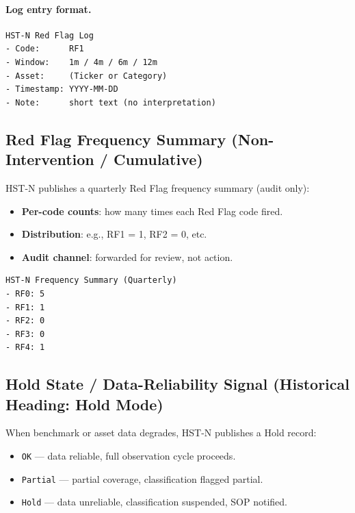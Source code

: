 \paragraph{Log entry format.}

\begin{lstlisting}[basicstyle=\ttfamily\small,frame=single]
HST-N Red Flag Log
- Code:      RF1
- Window:    1m / 4m / 6m / 12m
- Asset:     (Ticker or Category)
- Timestamp: YYYY-MM-DD
- Note:      short text (no interpretation)
\end{lstlisting}

\subsection{Red Flag Frequency Summary
(Non-Intervention / Cumulative)}
\label{sec:hstn-v11-frequency-summary}

HST-N publishes a quarterly Red Flag frequency summary (audit only):

\begin{itemize}
\item \textbf{Per-code counts}: how many times each Red Flag code
fired.
\item \textbf{Distribution}: e.g., RF1 = 1, RF2 = 0, etc.
\item \textbf{Audit channel}: forwarded for review, not action.
\end{itemize}

\begin{lstlisting}[basicstyle=\ttfamily\small,frame=single]
HST-N Frequency Summary (Quarterly)
- RF0: 5
- RF1: 1
- RF2: 0
- RF3: 0
- RF4: 1
\end{lstlisting}

\subsection{Hold State / Data-Reliability Signal
(Historical Heading: Hold Mode)}
\label{sec:hstn-v11-hold-mode}


When benchmark or asset data degrades, HST-N publishes a Hold
record:

\begin{itemize}
\item \texttt{OK} --- data reliable, full observation cycle proceeds.
\item \texttt{Partial} --- partial coverage, classification flagged
partial.
\item \texttt{Hold} --- data unreliable, classification suspended,
SOP notified.
\end{itemize}

